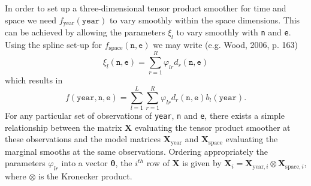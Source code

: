 \documentclass[12pt]{article}
\theoremstyle{definition}
\theoremstyle{plain}
\begin{document}
In order to set up a three-dimensional tensor product smoother for time and space we need $f_\text{year}(\texttt{year})$ to vary smoothly within the space dimensions. This can be achieved by allowing the parameters $\xi_l$ to vary smoothly with \texttt{n} and \texttt{e}. Using the spline set-up for $f_\text{space}(\texttt{n},\texttt{e})$ we may write (e.g. Wood, 2006, p. 163)
$$
\xi_l(\texttt{n},\texttt{e})=\sum_{r=1}^R \varphi_{lr} d_r(\texttt{n},\texttt{e})
$$    
which results in
$$
f(\texttt{year},\texttt{n},\texttt{e})=\sum_{l=1}^L \sum_{r=1}^R \varphi_{lr} d_r(\texttt{n},\texttt{e}) b_l(\texttt{year}). 
$$
For any particular set of observations of \texttt{year}, \texttt{n} and \texttt{e}, there exists a simple relationship between the matrix $\textbf{X}$ evaluating the tensor product smoother at these observations and the model matrices $\textbf{X}_\text{year}$ and $\textbf{X}_\text{space}$ evaluating the marginal smooths at the same observations. Ordering appropriately the parameters $\varphi_{lr}$ into a vector $\bm\theta$, the $i^{th}$ row of $\textbf{X}$ is given by $\textbf{X}_{i}=\textbf{X}_{\text{year},i}\otimes\textbf{X}_{\text{space},i}$, where $\otimes$ is the Kronecker product. 
\end{document}
